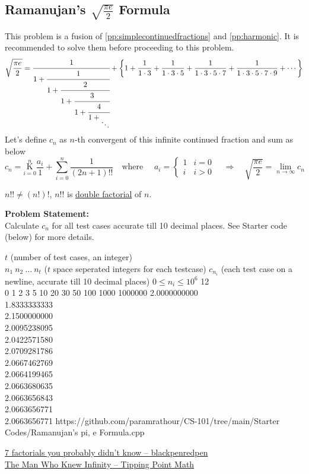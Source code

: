 \subsection{Ramanujan's $\sqrt{\frac{\pi e}{2}}$ Formula}{\label{pp:ramanujanpieformula}}
This problem is a fusion of \ref{pp:simplecontinuedfractions} and \ref{pp:harmonic}. It is recommended to solve them before proceeding to this problem.
\begin{equation}
 \sqrt{\frac{\pi e}{2}}=\cfrac{1}{1+{\cfrac {1}{1+{\cfrac {2}{1+{\cfrac {3}{1+{{\cfrac{4}{1+{_{\ddots }}} }}}}}}}}} + \left\{1 + \frac{1}{1\cdot3}+\frac{1}{1\cdot3\cdot5}+\frac{1}{1\cdot3\cdot5\cdot7}+\frac{1}{1\cdot3\cdot5\cdot7\cdot9}+\cdots\right\}
\end{equation}
Let's define $c_n$ as $n$-th convergent of this infinite continued fraction and sum as below
\begin{equation*}
c_n={\underset {i=0}{\overset {n }{\mathrm {K} }}}{\frac {a_i}{1}} + \sum_{i = 0}^n \frac{1}{(2n+1)!!} \quad\text{where }\quad a_i = \begin{cases} 
      1 & i = 0 \\
      i & i > 0
   \end{cases}\quad\Rightarrow\quad  \sqrt{\frac{\pi e}{2}} = \lim_{n\rightarrow\infty}c_n
\end{equation*}
\begin{note}
$n!! \neq (n!)!$, $n!!$ is \href{https://en.wikipedia.org/wiki/Double_factorial}{double factorial} of $n$.
\end{note}
\textbf{Problem Statement:}\\
Calculate $c_n$ for all test cases accurate till 10 decimal places. See Starter code (below) for more details.
\begin{testcases}
	{$t$ \hfill(number of test cases, an integer)\\$n_1\ n_2\ \ldots\ n_t$ \hfill($t$ space seperated integers for each testcase)}
	{$c_{n_i}$ \hfill(each test case on a newline, accurate till 10 decimal places)}
	{$0 \leq n_i \leq 10^{6}$}
	{12\\0 1 2 3 5 10 20 30 50 100 1000 1000000}
	{2.0000000000\\1.8333333333\\2.1500000000\\2.0095238095\\2.0422571580\\2.0709281786\\2.0667462769\\2.0664199465\\2.0663680635\\2.0663656843\\2.0663656771\\2.0663656771}
	{https://github.com/paramrathour/CS-101/tree/main/Starter Codes/Ramanujan's pi, e Formula.cpp}
\end{testcases}
\begin{funvideo}
\href{https://youtu.be/7eboFOkRHr4}{7 factorials you probably didn't know -- blackpenredpen}
\\\href{https://youtu.be/P0idBBhGNgU}{The Man Who Knew Infinity -- Tipping Point Math}
\end{funvideo}